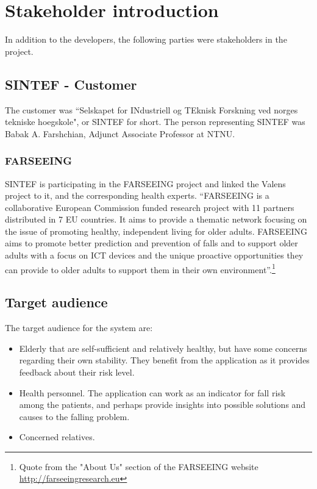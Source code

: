 \section{Stakeholder introduction}
In addition to the developers, the following parties were stakeholders in the project.

\subsection{SINTEF - Customer}
The customer was ``Selskapet for INdustriell og TEknisk Forskning ved norges tekniske hoegskole", or SINTEF for short. The person representing SINTEF was Babak A. Farshchian, Adjunct Associate Professor at NTNU.

\subsubsection{FARSEEING}
SINTEF is participating in the FARSEEING project and linked the Valens project to it, and the corresponding health experts. ``FARSEEING is a collaborative European Commission funded research project with 11 partners distributed in 7 EU countries. It aims to provide a thematic network focusing on the issue of promoting healthy, independent living for older adults. FARSEEING aims to promote better prediction and prevention of falls and to support older adults with a focus on ICT devices and the unique proactive opportunities they can provide to older adults to support them in their own environment''.\footnote{Quote from the "About Us" section of the FARSEEING website \url{http://farseeingresearch.eu}}

\subsection{Target audience}
The target audience for the system are:
\begin{itemize}
\item Elderly that are self-sufficient and relatively healthy, but have some concerns regarding their own stability. They benefit from the application as it provides feedback about their risk level.
\item Health personnel. The application can work as an indicator for fall risk among the patients, and perhaps provide insights into possible 
solutions and causes to the falling problem.
\item Concerned relatives.
\end{itemize}

